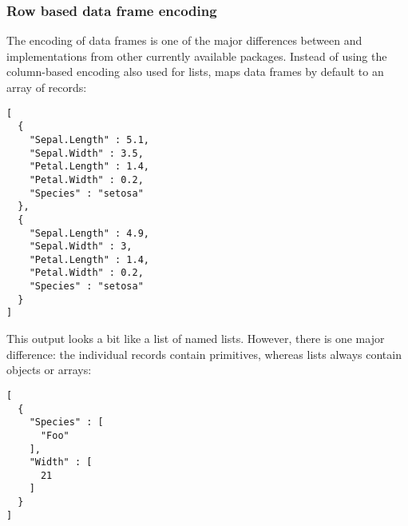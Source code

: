 \subsubsection{Row based data frame encoding}

The encoding of data frames is one of the major differences between \jsonlite and implementations from other currently available packages. Instead of using the column-based encoding also used for lists, \jsonlite maps data frames by default to an array of records:

\begin{knitrout}\mycodesize
{}\color{fgcolor}\begin{kframe}
\begin{alltt}
\hlstd{(}\hlstd{(iris[}\hlopt{:}\hlstd{, ],}  \hlstd{=} \hlstd{))}
\end{alltt}
\begin{verbatim}
[
  {
    "Sepal.Length" : 5.1,
    "Sepal.Width" : 3.5,
    "Petal.Length" : 1.4,
    "Petal.Width" : 0.2,
    "Species" : "setosa"
  },
  {
    "Sepal.Length" : 4.9,
    "Sepal.Width" : 3,
    "Petal.Length" : 1.4,
    "Petal.Width" : 0.2,
    "Species" : "setosa"
  }
]
\end{verbatim}
\end{kframe}
\end{knitrout}


 This output looks a bit like a list of named lists. However, there is one major difference: the individual records contain \JSON primitives, whereas lists always contain \JSON objects or arrays:

\begin{knitrout}\mycodesize
{}\color{fgcolor}\begin{kframe}
\begin{alltt}
\hlstd{(}\hlstd{(}\hlstd{(}\hlstd{(} \hlstd{=} \hlstd{,}  \hlstd{=} \hlstd{)),}  \hlstd{=} \hlstd{))}
\end{alltt}
\begin{verbatim}
[
  {
    "Species" : [
      "Foo"
    ],
    "Width" : [
      21
    ]
  }
]
\end{verbatim}
\end{kframe}
\end{knitrout}



